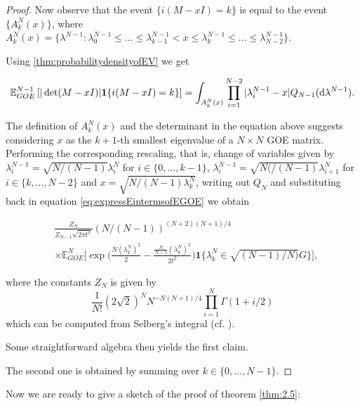 \begin{proof}
Now observe that the event $\{i(M-xI)=k\}$ is equal to the event $\{A_k^N(x)\}$, where $A_k^N(x) = \{\lambda^{N-1}: \lambda_0^{N-1}\leq\dots\leq\lambda_{k-1}^{N-1}<x\leq\lambda_k^{N-1}\leq\dots\leq\lambda_{N-2}^{N-1}\}$.

Using \ref{thm:probabilitydensityofEV} we get

\begin{equation*}
	\mathbb E_{GOE}^{N-1}\left[|\det(M-xI)|\mathbf 1\{i(M-xI)=k\}\right]=\int_{A_k^N(x)}\prod_{i=1}^{N-2}|\lambda_i^{N-1}-x|Q_{N-1}(\mathop{}\!\mathrm{d}\lambda^{N-1}).
\end{equation*}

The definition of $A_k^N(x)$ and the determinant in the equation above suggests considering $x$ as the $k+1$-th smallest eigenvalue of a $N\times N$ GOE matrix. Performing the corresponding rescaling, that is, change of variables given by $\lambda_i^{N-1}=\sqrt{N/(N-1)}\lambda_i^N$ for $i\in\{0,\dots,k-1\}$, $\lambda_i^{N-1}=\sqrt{N(/(N-1)}\lambda_{i+1}^N$ for $i\in\{k,\dots,N-2\}$ and $x=\sqrt{N/(N-1)\lambda_k^N}$, writing out $Q_N$ and substituting back in equation \ref{eq:expressEintermsofEGOE} we obtain

\begin{align*}
	&\frac{Z_N}{Z_{N-1}\sqrt{2\pi t^2}}(N/(N-1))^{(N+2)(N+1)/4}\\
	&\times\mathbb E_{GOE}^N\Big[\exp\Big(\frac{N(\lambda_k^N)^2}{2}-\frac{\frac{N}{N-1}(\lambda_k^N)^2}{2t^2}\Big)\mathbf 1\{\lambda_k^N\in\sqrt{(N-1)/N)}G\}\Big],
\end{align*}

where the constants $Z_N$ is given by $$\frac{1}{N!}(2\sqrt 2)^N N^{-N(N+1)/4}\prod_{i=1}^N \Gamma(1+i/2)$$ which can be computed from Selberg's integral (cf. \cite{Mehta2004random}).

Some straightforward algebra then yields the first claim.

The second one is obtained by summing over $k\in\{0,\dots,N-1\}$.

\end{proof}

Now we are ready to give a sketch of the proof of theorem \ref{thm:2.5}:

